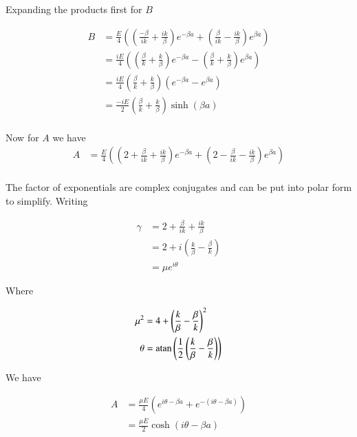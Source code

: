 \documentclass{article}
\DeclareMathOperator{\atan}{atan}
\begin{document}
Expanding the products first for $B$

\begin{align*}
B 
&= \frac{E}{4}\left( \left(\frac{-\beta}{ik} + \frac{ik}{\beta} \right) e^{ -\beta a} + \left(\frac{\beta}{ik} - \frac{ik}{\beta} \right) e^{ \beta a } \right) \\
&= \frac{iE}{4}\left( \left(\frac{\beta}{k} + \frac{k}{\beta} \right) e^{ -\beta a} - \left(\frac{\beta}{k} + \frac{k}{\beta} \right) e^{ \beta a } \right) \\
&= \frac{iE}{4}\left(\frac{\beta}{k} + \frac{k}{\beta} \right) \left( e^{ -\beta a} - e^{ \beta a } \right) \\
&= \frac{-iE}{2}\left(\frac{\beta}{k} + \frac{k}{\beta} \right) \sinh\left( \beta a \right) \\
\end{align*}

Now for $A$ we have
\begin{align*}
A &= \frac{E}{4}\left( \left(2 + \frac{\beta}{ik} + \frac{ik}{\beta} \right) e^{ -\beta a} + \left(2 - \frac{\beta}{ik} - \frac{ik}{\beta} \right) e^{ \beta a } \right) \\
\end{align*}

The factor of exponentials are complex conjugates and can be put into polar form to simplify.  Writing

\begin{align*}
\gamma 
&= 2 + \frac{\beta}{ik} + \frac{ik}{\beta} \\
&= 2 + i \left( \frac{k}{\beta} -\frac{\beta}{k} \right) \\
&= \mu e^{i \theta} 
\end{align*}

Where 

\begin{align}\label{eqn:muAndTheta}
\mu^2 &= 4 + \left( \frac{k}{\beta} -\frac{\beta}{k} \right)^2 \\
\theta &= \atan\left( \inv{2} \left(\frac{k}{\beta} - \frac{\beta}{k} \right) \right)
\end{align}

We have

\begin{align*}
A 
&= \frac{\mu E}{4}\left( e^{ i\theta -\beta a} + e^{ -(i \theta - \beta a) } \right) \\
&= \frac{\mu E}{2}\cosh\left( i\theta -\beta a \right) \\
\end{align*}
\end{document}
